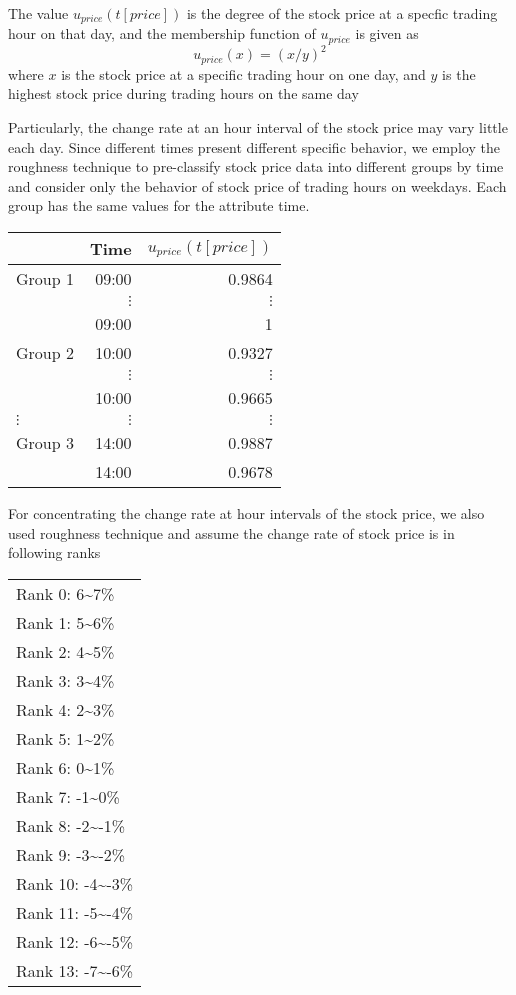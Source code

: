 \documentclass[11pt]{article}
\begin{document}
The value \(u_{price}(t[price])\) is the degree of the stock price at a
specfic trading hour on that day, and the membership function of
\(u_{price}\) is given as
\begin{equation*}
u_{price}(x)=(x/y)^2
\end{equation*}
where \(x\) is the stock price at a specific trading hour on one day, and
\(y\) is the highest stock price during trading hours on the same day

Particularly, the change rate at an hour interval of the stock price may vary
little each day. Since different times present different specific behavior,
we employ the roughness technique to pre-classify stock price data into
different groups by time and consider only the behavior of stock price of
trading hours on weekdays. Each group has the same values for the attribute
time.

\begin{center}
\begin{tabular}{lrr}
\hline
 & Time & \(u_{price}(t[price])\)\\
\hline
Group 1 & 09:00 & 0.9864\\
 & \(\vdots\) & \(\vdots\)\\
 & 09:00 & 1\\
Group 2 & 10:00 & 0.9327\\
 & \(\vdots\) & \(\vdots\)\\
 & 10:00 & 0.9665\\
\(\vdots\) & \(\vdots\) & \(\vdots\)\\
Group 3 & 14:00 & 0.9887\\
 & 14:00 & 0.9678\\
\hline
\end{tabular}
\end{center}

For concentrating the change rate at hour intervals of the stock price, we
also used roughness technique and assume the change rate of stock price is in
following ranks

\begin{center}
\begin{tabular}{l}
\hline
Rank 0: 6\textasciitilde{}7\%\\
Rank 1: 5\textasciitilde{}6\%\\
Rank 2: 4\textasciitilde{}5\%\\
Rank 3: 3\textasciitilde{}4\%\\
Rank 4: 2\textasciitilde{}3\%\\
Rank 5: 1\textasciitilde{}2\%\\
Rank 6: 0\textasciitilde{}1\%\\
Rank 7: -1\textasciitilde{}0\%\\
Rank 8: -2\textasciitilde{}-1\%\\
Rank 9: -3\textasciitilde{}-2\%\\
Rank 10: -4\textasciitilde{}-3\%\\
Rank 11: -5\textasciitilde{}-4\%\\
Rank 12: -6\textasciitilde{}-5\%\\
Rank 13: -7\textasciitilde{}-6\%\\
\hline
\end{tabular}
\end{center}
\end{document}
